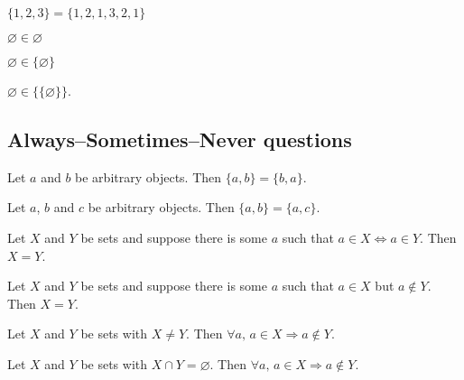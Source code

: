 \begin{chapex}
$\{ 1, 2, 3 \} = \{ 1, 2, 1, 3, 2, 1 \}$
\end{chapex}

\begin{chapex}
$\varnothing \in \varnothing$
\end{chapex}

\begin{chapex}
$\varnothing \in \{ \varnothing \}$
\end{chapex}

\begin{chapex}
$\varnothing \in \{ \{ \varnothing \} \}$.
\end{chapex}

\begin{chapex}
\label{cqSetsTFEnd}
\end{chapex}

\subsection*{Always--Sometimes--Never questions}


\begin{chapex} %
\label{cqSetsASNBegin}
Let $a$ and $b$ be arbitrary objects. Then $\{ a, b \} = \{ b, a \}$.
\end{chapex}

\begin{chapex} %
Let $a$, $b$ and $c$ be arbitrary objects. Then $\{ a, b \} = \{ a, c \}$.
\end{chapex}

\begin{chapex} %
Let $X$ and $Y$ be sets and suppose there is some $a$ such that $a \in X \Leftrightarrow a \in Y$. Then $X = Y$.
\end{chapex}

\begin{chapex} %
Let $X$ and $Y$ be sets and suppose there is some $a$ such that $a \in X$ but $a \not\in Y$. Then $X = Y$.
\end{chapex}

\begin{chapex} %
Let $X$ and $Y$ be sets with $X \ne Y$. Then $\forall a,\, a \in X \Rightarrow a \not\in Y$.
\end{chapex}

\begin{chapex} %
Let $X$ and $Y$ be sets with $X \cap Y = \varnothing$. Then $\forall a,\, a \in X \Rightarrow a \not\in Y$.
\end{chapex}

